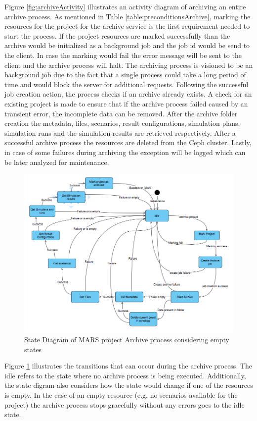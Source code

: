 Figure \ref{fig:archiveActivity} illustrates an activity diagram of archiving an entire archive process. As mentioned in Table \ref{table:preconditionsArchive},
marking the resources for the project for the archive service is the first requirement needed to start the process. If the project resources are marked successfully
than the archive would be initialized as a background job and the job id would be send to the client. In case the marking would fail the error message will be 
sent to the client and the archive process will halt. The archiving process is visioned to be an background job due to the fact that a single process could take
a long period of time and would block the server for additional requests. Following the successful job creation action, the process checks if an archive already
exists. A check for an existing project is made to ensure that if the archive process failed caused by an transient error, the incomplete data can be removed. After
the archive folder creation the metadata, files, scenarios, result configurations, simulation plans, simulation runs and the simulation results are retrieved respectively.
After a successful archive process the  resources are deleted from the Ceph cluster. Lastly, in case of some failures during archiving the exception will be logged 
which can be later analyzed for maintenance.

\begin{figure}[H]
    \centering \includegraphics[scale=0.45]{grafiken/stateArchive.png}
    \caption{State Diagram of MARS project Archive process considering empty states}
    \label{fig:stateArchive}
\end{figure}

Figure \ref{fig:stateArchive} illustrates the transitions that can occur during the archive process. The idle refers to the state where no archive process
is being executed. Additionally, the state digram also considers
how the state would change if one of the resources is empty. In the case of an empty resource (e.g. no scenarios available for the project) the archive
process stops gracefully without any errors goes to the idle state. 

 